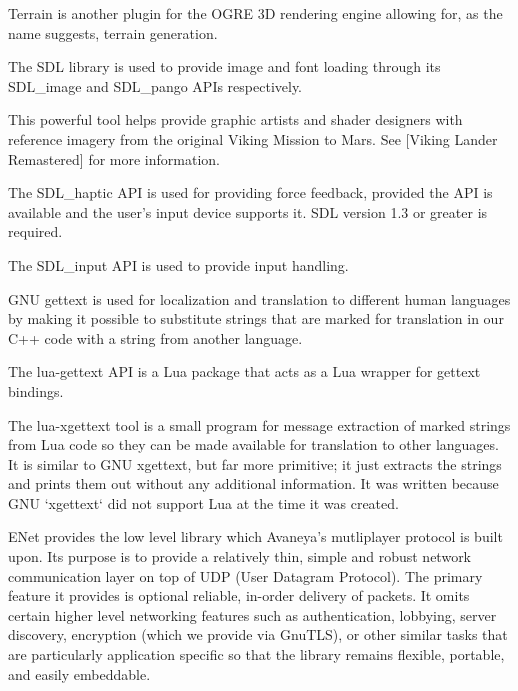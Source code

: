 
Terrain is another plugin for the OGRE 3D rendering engine allowing for, as the name suggests, terrain generation.


The SDL library is used to provide image and font loading through its SDL_image and SDL_pango APIs respectively.


This powerful tool helps provide graphic artists and shader designers with reference imagery from the original Viking Mission to Mars. See [Viking Lander Remastered] for more information.
\stopitemize


\startitemize[4]

The SDL_haptic API is used for providing force feedback, provided the API is available and the user's input device supports it. SDL version 1.3 or greater is required.


The SDL_input API is used to provide input handling.
\stopitemize



\startitemize[4]

GNU gettext is used for localization and translation to different human languages by making it possible to substitute strings that are marked for translation in our C++ code with a string from another language.


The lua-gettext API is a Lua package that acts as a Lua wrapper for gettext bindings.


The lua-xgettext tool is a small program for message extraction of marked strings from Lua code so they can be made available for translation to other languages. It is similar to GNU xgettext, but far more primitive; it just extracts the strings and prints them out without any additional information. It was written because GNU `xgettext` did not support Lua at the time it was created.
\stopitemize


\startitemize[4]

ENet provides the low level library which Avaneya's mutliplayer protocol is built upon. Its purpose is to provide a relatively thin, simple and robust network communication layer on top of UDP (User Datagram Protocol). The primary feature it provides is optional reliable, in-order delivery of packets. It omits certain higher level networking features such as authentication, lobbying, server discovery, encryption (which we provide via GnuTLS), or other similar tasks that are particularly application specific so that the library remains flexible, portable, and easily embeddable.

